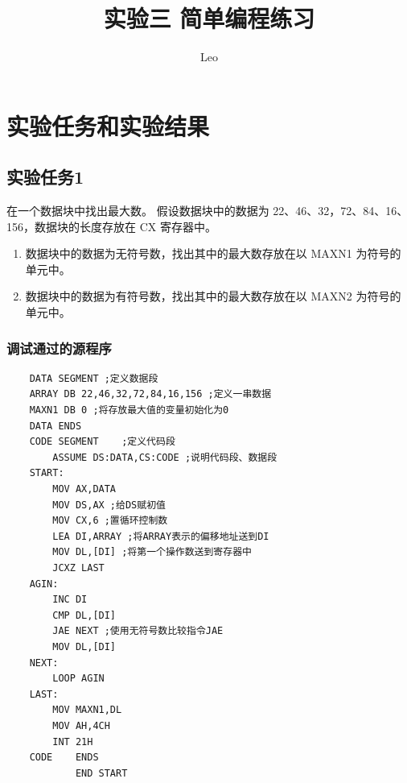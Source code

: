 \documentclass[12pt, a4paper, oneside]{ctexart}
\title{实验三 \qquad  简单编程练习}
\author{Leo}
\date{}
\begin{document}
\maketitle
\section{实验任务和实验结果}
\subsection{实验任务1}
在一个数据块中找出最大数。 
假设数据块中的数据为 22、46、32，72、84、16、156，数据块的长度存放在 CX 寄存器中。
\begin{enumerate}
    \item 数据块中的数据为无符号数，找出其中的最大数存放在以 MAXN1 为符号的单元中。
    \item 数据块中的数据为有符号数，找出其中的最大数存放在以 MAXN2 为符号的单元中。 
\end{enumerate} 
\subsubsection{调试通过的源程序}
\begin{lstlisting}
    DATA SEGMENT ;定义数据段
    ARRAY DB 22,46,32,72,84,16,156 ;定义一串数据
    MAXN1 DB 0 ;将存放最大值的变量初始化为0 
    DATA ENDS
    CODE SEGMENT 	;定义代码段
        ASSUME DS:DATA,CS:CODE ;说明代码段、数据段
    START: 
        MOV AX,DATA 
        MOV DS,AX ;给DS赋初值
        MOV CX,6 ;置循环控制数
        LEA DI,ARRAY ;将ARRAY表示的偏移地址送到DI
        MOV DL,[DI] ;将第一个操作数送到寄存器中
        JCXZ LAST 
    AGIN:
        INC DI
        CMP DL,[DI]
        JAE NEXT ;使用无符号数比较指令JAE
        MOV DL,[DI]
    NEXT:
        LOOP AGIN
    LAST:
        MOV MAXN1,DL
        MOV AH,4CH
        INT 21H
    CODE 	ENDS
            END START
\end{lstlisting}
\end{document}
